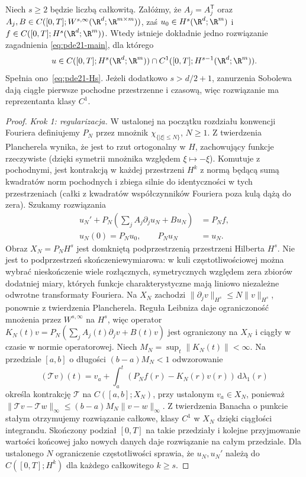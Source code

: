 \begin{twierdzenie}
\label{thm:pde21-existence}
Niech $s\ge2$ będzie liczbą całkowitą. Załóżmy, że
$A_j=A_j^\mathsf T$ oraz
$A_j,B\in C([0,T];W^{s,\infty}(\R^d;\R^{m\times m}))$,
zaś $u_0\in H^s(\R^d;\R^m)$ i
$f\in C([0,T];H^s(\R^d;\R^m))$.
Wtedy istnieje dokładnie jedno rozwiązanie zagadnienia
\eqref{eq:pde21-main}, dla którego
\[
 u\in C([0,T];H^s(\R^d;\R^m))\cap
 C^1([0,T];H^{s-1}(\R^d;\R^m)).
\]
Spełnia ono~\eqref{eq:pde21-Hs}.
Jeżeli dodatkowo $s>d/2+1$, zanurzenia Sobolewa
dają ciągłe pierwsze pochodne przestrzenne i czasową,
więc rozwiązanie ma reprezentanta klasy $C^1$.
\end{twierdzenie}
\begin{proof}
\emph{Krok 1: regularizacja.}
W ustalonej na początku rozdziału konwencji Fouriera
definiujemy $P_N$ przez mnożnik $\chi_{\{|\xi|\le N\}}$, $N\ge1$.
Z twierdzenia Plancherela wynika, że jest to rzut
ortogonalny w $H$, zachowujący funkcje rzeczywiste
(dzięki symetrii mnożnika względem $\xi\mapsto-\xi$).
Komutuje z pochodnymi, jest kontrakcją w każdej
przestrzeni $H^k$ z normą będącą sumą kwadratów norm
pochodnych i zbiega silnie do identyczności w tych
przestrzeniach (całki z kwadratów współczynników
Fouriera poza kulą dążą do zera).
Szukamy rozwiązania
\begin{equation}\label{eq:pde21-friedrichs}
 \begin{split}
 u_N'+P_N\left(\sum_j A_j\partial_j u_N+Bu_N\right)&=P_Nf,\\
 u_N(0)=P_Nu_0,\qquad P_Nu_N&=u_N.
 \end{split}
\end{equation}
Obraz $X_N=P_NH^s$ jest domkniętą podprzestrzenią
przestrzeni Hilberta $H^s$. Nie jest to podprzestrzeń
skończeniewymiarowa: w kuli częstotliwościowej
można wybrać nieskończenie wiele rozłącznych,
symetrycznych względem zera zbiorów dodatniej miary,
których funkcje charakterystyczne mają liniowo
niezależne odwrotne transformaty Fouriera.
Na $X_N$ zachodzi
$\|\partial_jv\|_{H^s}\le N\|v\|_{H^s}$,
ponownie z twierdzenia Plancherela.
Reguła Leibniza daje ograniczoność mnożenia przez
$W^{s,\infty}$ na $H^s$, więc operator
$K_N(t)v=P_N(\sum_j A_j(t)\partial_jv+B(t)v)$
jest ograniczony na $X_N$ i ciągły w czasie w normie
operatorowej. Niech $M_N=\sup_t\|K_N(t)\|<\infty$.
Na przedziale $[a,b]$ o długości $(b-a)M_N<1$
odwzorowanie
\[
 (\mathcal T v)(t)=v_a+\int_a^t(P_Nf(r)-K_N(r)v(r))
 \,\mathrm d\lambda_1(r)
\]
określa kontrakcję $\mathcal T$ na $C([a,b];X_N)$,
przy ustalonym $v_a\in X_N$, ponieważ
$\|\mathcal Tv-\mathcal Tw\|_\infty
\le(b-a)M_N\|v-w\|_\infty$. Z twierdzenia Banacha o punkcie stałym
otrzymujemy rozwiązanie całkowe, klasy $C^1$ w $X_N$
dzięki ciągłości integrandu. Skończony podział
$[0,T]$ na takie przedziały i kolejne przyjmowanie
wartości końcowej jako nowych danych daje rozwiązanie
na całym przedziale. Dla ustalonego $N$ ograniczenie
częstotliwości sprawia, że $u_N,u_N'$ należą do
$C([0,T];H^k)$ dla każdego całkowitego $k\ge s$.


\end{proof}
